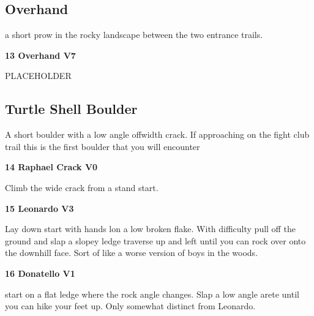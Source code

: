 \begin{multicols}{2}
			\subsection*{Overhand}\label{bf:Overhand}
			\begin{minipage}{\columnwidth}
			a short prow in the rocky landscape between the two entrance trails.
			\end{minipage}
			

					\begin{minipage}{\linewidth}	
					\label{rt:Overhand}\colorbox{Goldenrod!50}{\textbf{13 Overhand V7  }}
					\begin{adjustwidth}{0.5cm}{}				
					PLACEHOLDER
					\end{adjustwidth}
					\end{minipage}
			\subsection*{Turtle Shell Boulder}\label{bf:Turtle Shell Boulder}
			\begin{minipage}{\columnwidth}
			A short boulder with a low angle offwidth crack. If approaching on the fight club trail this is the first boulder that you will encounter
			\end{minipage}
			

					\begin{minipage}{\linewidth}	
					\label{rt:Raphael Crack}\colorbox{green!20}{\textbf{14 Raphael Crack V0   }}
					\begin{adjustwidth}{0.5cm}{}				
					Climb the wide crack from a stand start.
					\end{adjustwidth}
					\end{minipage}
					\begin{minipage}{\linewidth}	
					\label{rt:Leonardo}\colorbox{green!20}{\textbf{15 Leonardo V3   }}
					\begin{adjustwidth}{0.5cm}{}				
					Lay down start with hands lon a low broken flake. With difficulty pull off the ground and slap a slopey ledge traverse up and left until you can rock over onto the downhill face. Sort of like a worse version of boys in the woods.
					\end{adjustwidth}
					\end{minipage}
					\begin{minipage}{\linewidth}	
					\label{rt:Donatello}\colorbox{green!20}{\textbf{16 Donatello V1   }}
					\begin{adjustwidth}{0.5cm}{}				
					start on a flat ledge where the rock angle changes. Slap a low angle arete until you can hike your feet up. Only somewhat distinct from Leonardo.
					\end{adjustwidth}
					\end{minipage}
\end{multicols}

